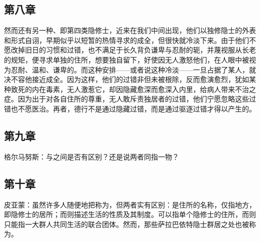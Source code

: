 
\subsection{第八章}

\par

然而还有另一种、即第四类隐修士，近来在我们中间出现，他们以独修隐士的外表和形式自诩，早期似乎以短暂的热情寻求的成全，但很快就冷淡下来。由于他们不愿改掉旧日的习惯和过错，也不满足于长久背负谦卑与忍耐的轭，并蔑视服从长老的规矩，便寻求单独的住所，想要独自留下，好使因无人激怒他们，在人眼中被视为忍耐、温和、谦卑的。而这种安排——或者说这种冷淡——一旦占据了某人，就决不容他接近成全。因为这样，他们的过错非但未被根除，反而愈演愈烈，犹如某种致死的内在毒素，无人激惹它，却因隐藏愈深而愈深入内里，给病人带来不治之症。因为出于对各自住所的尊重，无人敢斥责独居者的过错，他们宁愿忽略这些过错也不愿医治。再者，德行不是通过隐藏过错，而是通过驱逐过错才得以产生的。\par


\subsection{第九章}

\par

格尔马努斯：与之间是否有区别？还是说两者同指一物？\par


\subsection{第十章}

\par

皮亚蒙：虽然许多人随便地把称为，但两者实有区别：是住所的名称，仅指地方，即隐修士的居所；而则描述生活的性质及其制度。可以指单个隐修士的住所，而则只能指一大群人共同生活的联合团体。然而，那些萨拉巴依特隐士群居之处也被称为。\par

